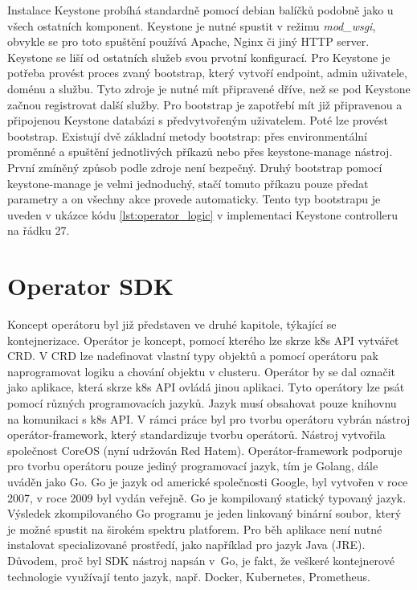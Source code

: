 Instalace Keystone probíhá standardně pomocí debian balíčků podobně jako u všech ostatních komponent. Keystone je nutné spustit v režimu \textit{mod\_wsgi}, obvykle se pro toto spuštění používá Apache, Nginx či jiný HTTP server. Keystone se liší od ostatních služeb svou prvotní konfigurací. Pro Keystone je potřeba provést proces zvaný bootstrap, který vytvoří endpoint, admin uživatele, doménu a službu. Tyto zdroje je nutné mít připravené dříve, než se pod Keystone začnou registrovat další služby. Pro bootstrap je zapotřebí mít již připravenou a připojenou Keystone databázi s předvytvořeným uživatelem. Poté lze provést bootstrap. Existují dvě základní metody bootstrap: přes environmentální proměnné a spuštění jednotlivých příkazů nebo přes keystone-manage nástroj. První zmíněný způsob podle zdroje \cite{envboot_dep} není bezpečný. Druhý bootstrap pomocí keystone-manage je velmi jednoduchý, stačí tomuto příkazu pouze předat parametry a on všechny akce provede automaticky. Tento typ bootstrapu je uveden v ukázce kódu \ref{lst:operator_logic} v implementaci Keystone controlleru na řádku 27.

\section{Operator SDK}
Koncept operátoru byl již představen ve druhé kapitole, týkající se kontejnerizace. Operátor je koncept, pomocí kterého lze skrze k8s API vytvářet CRD. V CRD lze nadefinovat vlastní typy objektů a pomocí operátoru pak naprogramovat logiku a chování objektu v clusteru. Operátor by se dal označit jako aplikace, která skrze k8s API ovládá jinou aplikaci. Tyto operátory lze psát pomocí různých programovacích jazyků. Jazyk musí obsahovat pouze knihovnu na komunikaci s k8s API. V rámci práce byl pro tvorbu operátoru vybrán nástroj operátor-framework, který standardizuje tvorbu operátorů. Nástroj vytvořila společnost CoreOS (nyní udržován Red Hatem). Operátor-framework podporuje pro tvorbu operátoru pouze jediný programovací jazyk, tím je Golang, dále uváděn jako Go. Go je jazyk od americké společnosti Google, byl vytvořen v roce 2007, v roce 2009 byl vydán veřejně. Go je kompilovaný statický typovaný jazyk. Výsledek zkompilovaného Go programu je jeden linkovaný binární soubor, který je možné spustit na širokém spektru platforem. Pro běh aplikace není nutné instalovat specializované prostředí, jako například pro jazyk Java (JRE). Důvodem, proč byl SDK nástroj napsán v Go, je fakt, že veškeré kontejnerové technologie využívají tento 
jazyk, např. Docker, Kubernetes, Prometheus.

